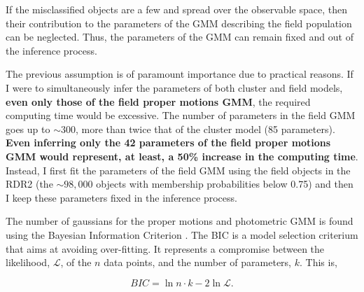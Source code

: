 
If the misclassified objects are a few and spread over the observable space, then their contribution to the parameters of the GMM describing the field population can be neglected. Thus, the parameters of the GMM can remain fixed and out of the inference process. 

The previous assumption is of paramount importance due to practical reasons. If I were to simultaneously infer the parameters of both cluster and field models, \textbf{even only those of the field proper motions GMM}, the required computing time would be excessive. The number of parameters in the field GMM goes up to $\sim 300$, more than twice that of the cluster model (85 parameters). \textbf{Even inferring only the 42 parameters of the field proper motions GMM would represent, at least, a 50\% increase in the computing time}. Instead, I first fit the parameters of the field GMM using the field objects in the RDR2 (the $\sim 98,000$ objects with membership probabilities below 0.75) and then I keep these parameters fixed in the inference process.   

The number of gaussians for the proper motions and photometric GMM is found using the Bayesian Information Criterion \cite[BIC,][]{Schwarz1978}. The BIC is a model selection criterium that aims at avoiding over-fitting. It represents a compromise between the likelihood, $\mathcal{L}$, of the $n$ data points, and the number of parameters, $k$. This is,

\begin{equation}
\label{eq:BIC}
BIC = \ln{n}\cdot k - 2 \ln{\mathcal{L}}.
\end{equation}

